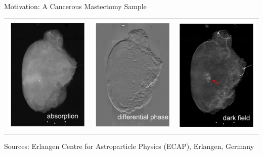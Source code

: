 \begin{frame}{Motivation: A Cancerous  Mastectomy Sample}
    \begin{center}
        \begin{tabular}{lll}
            \includegraphics[width=0.3\linewidth]{images/MastectomyAbsorption.pdf} & \includegraphics[width=0.3\linewidth]{images/MastectomyPhaseContrast.pdf} &
            \includegraphics[width=0.3\linewidth]{images/MastectomyDarkfield.pdf}
        \end{tabular}
    \end{center}
    \vspace{-0.3cm}
    \begin{flushright}
        \tiny Sources: Erlangen Centre for Astroparticle Physics (ECAP), Erlangen, Germany
    \end{flushright}
\end{frame}

